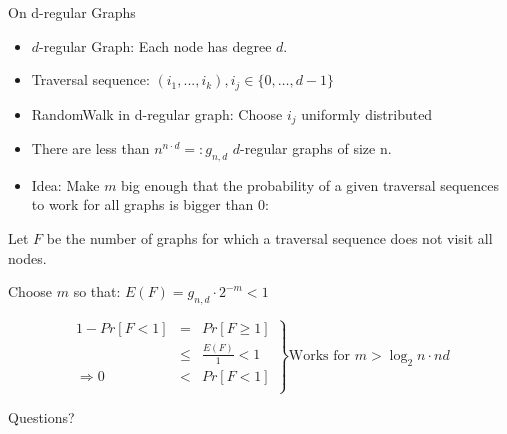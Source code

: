 \begin{frame}{On d-regular Graphs}

\begin{itemize}
\item
  $d$-regular Graph: Each node has degree $d$.
\item
  Traversal sequence: $(i_1, ... , i_k), i_j \in \{0, \dots, d-1\}$
\item
  RandomWalk in d-regular graph: Choose $i_j$ uniformly distributed
\item
  There are less than $n^{n \cdot d} =: g_{n,d}$ $d$-regular graphs of
  size n.
\item
  Idea: Make $m$ big enough that the probability of a given traversal
  sequences to work for all graphs is bigger than 0:
\end{itemize}

Let $F$ be the number of graphs for which a traversal sequence does not
visit all nodes.

Choose $m$ so that: $E(F) = g_{n, d} \cdot 2^{-m} < 1$

\[
\left.
\begin{array}{rcl}
1 - Pr[F < 1] & = & Pr[F \geq 1] \\
              & \leq & \frac{E(F)}{1} < 1 \\
\Rightarrow 0 & < & Pr[F < 1] \\
\end{array}
\right\}
\text{Works for } m > \log_2 n \cdot nd
\]

\end{frame}

\begin{frame}

\begin{block}
{\huge Questions?}
\end{block}

\end{frame}
